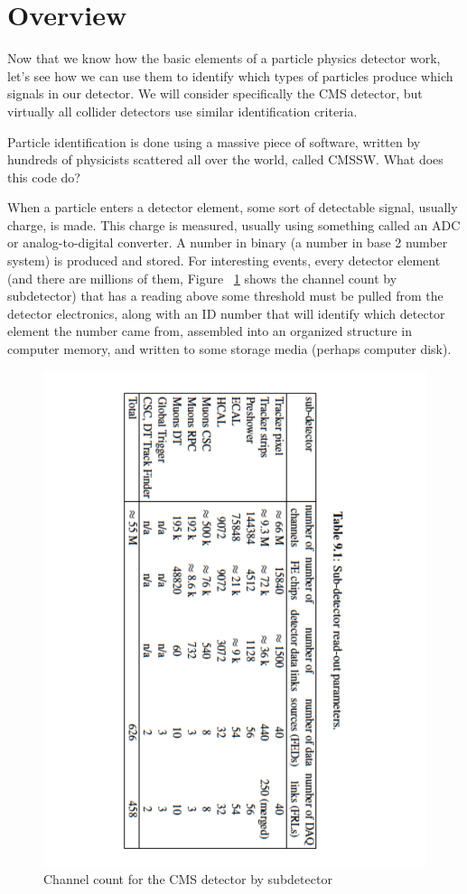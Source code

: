 \section{Overview}
Now that we know how the basic elements of a particle physics detector work, let's see how we can use them to identify which types of particles produce which signals in our detector.  
We will consider specifically the CMS detector, but virtually all collider detectors use similar identification criteria.

Particle identification is done using a massive piece of software, written by hundreds of physicists scattered all over the world, called CMSSW.  What does this code do?

When a particle enters a detector element, some sort of detectable signal, usually charge, is made.  This charge is measured, usually using something called an ADC or analog-to-digital converter.  A number in binary (a number in base 2 number system) is produced and stored. For interesting events, every detector element (and there are millions of them, Figure ~\ref{fig:count} shows the channel count by subdetector) that has a reading above some threshold must be pulled from the detector electronics, along with an ID number that will identify which detector element the number came from, assembled into an organized structure in computer memory, and written to some storage media (perhaps computer disk).  

\begin{figure}[ht]
\centering\includegraphics[scale=0.6,angle=90]{./particleID/Pictures/channelcount.pdf}
\caption{Channel count for the CMS detector by subdetector}
\label{fig:count}
\end{figure} 

